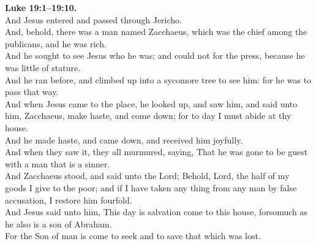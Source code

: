 \documentclass[12pt]{article} %
\begin{document}
{\begin{minipage}[t]{0.45\textwidth}
\textbf{Luke 19:1--19:10.}\\
And Jesus entered and passed through Jericho.\\
And, behold, there was a man named Zacchaeus, which was the chief among the publicans, and he was rich.\\
And he sought to see Jesus who he was; and could not for the press, because he was little of stature.\\
And he ran before, and climbed up into a sycomore tree to see him: for he was to pass that way.\\
And when Jesus came to the place, he looked up, and saw him, and said unto him, Zacchaeus, make haste, and come down; for to day I must abide at thy house.\\
And he made haste, and came down, and received him joyfully.\\
And when they saw it, they all murmured, saying, That he was gone to be guest with a man that is a sinner.\\
And Zacchaeus stood, and said unto the Lord; Behold, Lord, the half of my goods I give to the poor; and if I have taken any thing from any man by false accusation, I restore him fourfold.\\
And Jesus said unto him, This day is salvation come to this house, forsomuch as he also is a son of Abraham.\\
For the Son of man is come to seek and to save that which was lost.\\

\end{minipage}}
\vspace*{\fill}
\newpage
\huge%
\vspace*{\fill}
\begin{spacing}{1.3}
\end{spacing}
\vspace*{\fill}
\end{document}
